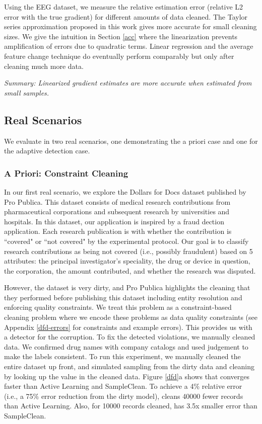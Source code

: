 Using the EEG dataset, we measure the relative estimation error (relative L2 error with the true gradient) for different amounts of data cleaned.
The Taylor series approximation proposed in this work gives more accurate for small cleaning sizes.
We give the intuition in Section \ref{acc} where the linearization prevents amplification of errors due to quadratic terms.
Linear regression and the average feature change technique do eventually perform comparably but only after cleaning much more data.

\vspace{0.25em}

\noindent \emph{Summary: Linearized gradient estimates are more accurate when estimated from small samples. }

\subsection{Real Scenarios}
We evaluate \sys in two real scenarios, one demonstrating the a priori case and one for the adaptive detection case.

\subsubsection{A Priori: Constraint Cleaning}
In our first real scenario, we explore the Dollars for Docs dataset published by Pro Publica.
This dataset consists of medical research contributions from pharmaceutical corporations and subsequent research by universities and hospitals.
In this dataset, our application is inspired by a fraud dection application.
Each research publication is with whether the contribution is ``covered" or ``not covered" by the experimental protocol.
Our goal is to classify research contributions as being not covered (i.e., possibly fraudulent) based on 5 attributes: the principal investigator's speciality, the drug or device in question, the corporation, the amount contributed, and whether the research was disputed.

However, the dataset is very dirty, and Pro Publica highlights the cleaning that they performed before publishing this dataset \cite{dollarsfordocs} including entity resolution and enforcing quality constraints.
We treat this problem as a constraint-based cleaning problem where we encode these problems as data quality constraints (see Appendix \ref{dfd-errors} for constraints and example errors). 
This provides us with a detector for the corruption. 
To fix the detected violations, we manually cleaned data.
We confirmed drug names with company catalogs and used judgement to make the labels consistent.
To run this experiment, we manually cleaned the entire dataset up front, and simulated sampling from the dirty data and cleaning by looking up the value in the cleaned data.
Figure \ref{dfd}a shows that \sys converges faster than Active Learning and SampleClean.
To achieve a 4\% relative error (i.e., a 75\% error reduction from the dirty model), \sys cleans 40000 fewer records than Active Learning.
Also, for 10000 records cleaned, \sys has 3.5x smaller error than SampleClean.


